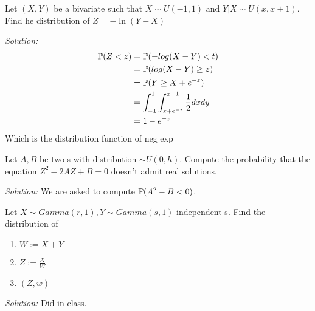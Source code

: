\begin{ex}
	Let $(X,Y)$ be a bivariate \rv such that $X\sim U(-1,1)$ and $Y|X\sim U(x,x+1)$. Find he distribution of $Z=-\ln(Y-X)$

\textit{Solution:}
\[
\begin{split}
\mathbb{P} (Z<z)
&=\mathbb{P} (-log(X-Y)<t)\\
&=\mathbb{P}(log(X-Y)\geq z)\\
&=\mathbb{P}(Y\geq X+ e^{-z})\\
&=\int_{-1}^{1}\int_{x+e^{-z}}^{x+1} \frac{1}{2} dxdy\\
&=1-e^{-z}
\end{split}
\]
Which is the distribution function of neg exp
\end{ex}
\begin{ex}
	Let $A,B$ be two \iid \rv s with distribution $\sim U(0,h)$. Compute the probability that the equation $Z^2 -2AZ+B=0$ doesn't admit real solutions.

\textit{Solution:}
We are asked to compute $\mathbb{P}(A^2-B<0)$.
\end{ex}
\begin{ex}
	Let $X\sim Gamma(r,1), Y\sim Gamma(s,1)$ independent \rv s. Find the distribution of
	\begin{enumerate}
		\item $W:=X+Y$
		\item $Z:=\frac{X}{W}$
		\item $(Z,w)$
	\end{enumerate}

\textit{Solution:}
Did in class.
\end{ex}
